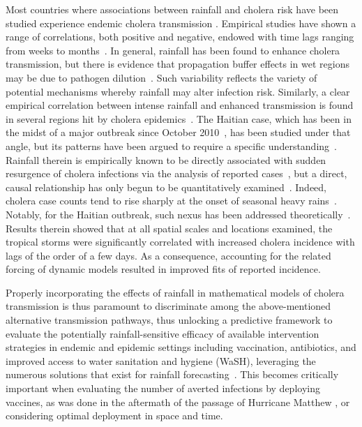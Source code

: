 Most countries where associations between rainfall and cholera risk have been studied experience endemic cholera transmission \cite{rinaldo17}. Empirical studies have shown a range of correlations, both positive and negative, endowed with time lags ranging from weeks to months~\cite{ruiz07,emch08,demagny12}. In general, rainfall has been found to enhance cholera transmission, but there is evidence that propagation buffer effects in wet regions may be due to pathogen dilution~\cite{ruiz07}. Such variability reflects the variety of potential mechanisms whereby rainfall may alter infection risk. Similarly, a clear empirical correlation between intense rainfall and enhanced transmission is found in several regions hit by cholera epidemics~\cite{demagny2008,rebaudet13a,rebaudet13b,jutla13a,gaudart13}. The Haitian case, which has been in the midst of a major outbreak since October 2010~\cite{frerichs12,gaudart13,kirpich2015,european2016,camacho16a,pasettoRealtimeProjectionsCholera2017,khan17}, has been studied under that angle, but its patterns have been argued to require a specific understanding~\cite{piarroux11}. Rainfall therein is empirically known to be directly associated with sudden resurgence of cholera infections via the analysis of reported cases~\cite{gaudart13}, but a direct, causal relationship has only begun to be quantitatively examined~\cite{rinaldoReassessment201020112012,eisenbergExaminingRainfallCholera2013,bertuzzoProbabilityExtinctionHaiti2016}. Indeed, cholera case counts tend to rise sharply at the onset of seasonal heavy rains~\cite{adams12,periago12,adams13}. Notably, for the Haitian outbreak, such nexus has been addressed theoretically~\cite{rinaldoReassessment201020112012,eisenbergExaminingRainfallCholera2013}. Results therein showed that at all spatial scales and locations examined, the tropical storms were significantly correlated with increased cholera incidence with lags of the order of a few days. As a consequence, accounting for the related forcing of dynamic models resulted in improved fits of reported incidence. 

Properly incorporating the effects of rainfall in mathematical models of cholera transmission is thus paramount to discriminate among the above-mentioned alternative transmission pathways, thus unlocking a predictive framework to evaluate the potentially rainfall-sensitive efficacy of available intervention strategies in endemic and epidemic settings including vaccination, antibiotics, and improved access to water sanitation and hygiene (WaSH), leveraging the numerous solutions that exist for rainfall forecasting~\cite{rinaldoReassessment201020112012,bertuzzoProbabilityExtinctionHaiti2016}. This becomes  critically important when evaluating the number of averted infections by deploying vaccines, as was done in the aftermath of the passage of Hurricane Matthew \cite{pasettoRealtimeProjectionsCholera2017}, or considering optimal deployment in space and time.

